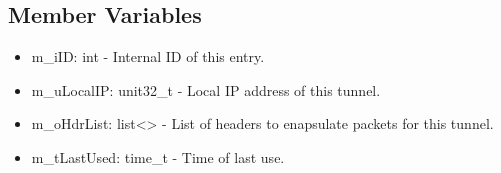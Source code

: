 \subsection{Member Variables}
\begin{itemize}
\item m\_iID: int - Internal ID of this entry.
\item m\_uLocalIP: unit32\_t - Local IP address of this tunnel.
\item m\_oHdrList: list<> - List of headers to enapsulate packets for this tunnel.
\item m\_tLastUsed: time\_t - Time of last use.
\end{itemize}
